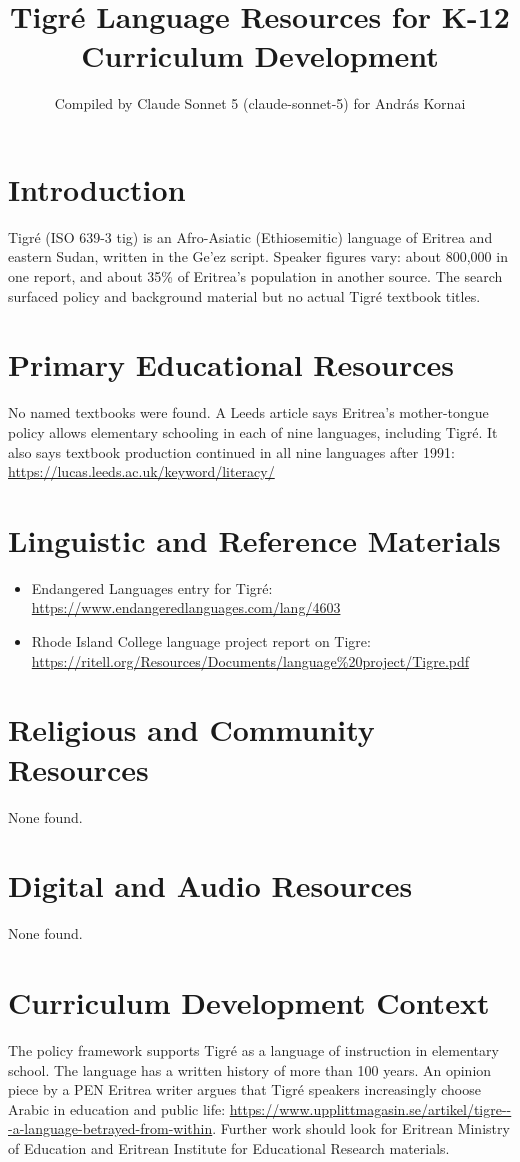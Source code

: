 \documentclass[12pt]{article}
\title{Tigr\'e Language Resources for K-12 Curriculum Development}
\author{Compiled by Claude Sonnet 5 (claude-sonnet-5) for Andr\'as Kornai}
\date{}
\begin{document}
\maketitle
\section{Introduction}
Tigr\'e (ISO 639-3 tig) is an Afro-Asiatic (Ethiosemitic) language of Eritrea and eastern Sudan, written in the Ge'ez script. Speaker figures vary: about 800,000 in one report, and about 35\% of Eritrea's population in another source. The search surfaced policy and background material but no actual Tigr\'e textbook titles.
\section{Primary Educational Resources}
No named textbooks were found. A Leeds article says Eritrea's mother-tongue policy allows elementary schooling in each of nine languages, including Tigr\'e. It also says textbook production continued in all nine languages after 1991: \url{https://lucas.leeds.ac.uk/keyword/literacy/}
\section{Linguistic and Reference Materials}
\begin{itemize}
\item Endangered Languages entry for Tigr\'e: \url{https://www.endangeredlanguages.com/lang/4603}
\item Rhode Island College language project report on Tigre: \url{https://ritell.org/Resources/Documents/language\%20project/Tigre.pdf}
\end{itemize}
\section{Religious and Community Resources}
None found.
\section{Digital and Audio Resources}
None found.
\section{Curriculum Development Context}
The policy framework supports Tigr\'e as a language of instruction in elementary school. The language has a written history of more than 100 years. An opinion piece by a PEN Eritrea writer argues that Tigr\'e speakers increasingly choose Arabic in education and public life: \url{https://www.upplittmagasin.se/artikel/tigre---a-language-betrayed-from-within}. Further work should look for Eritrean Ministry of Education and Eritrean Institute for Educational Research materials.
\end{document}
